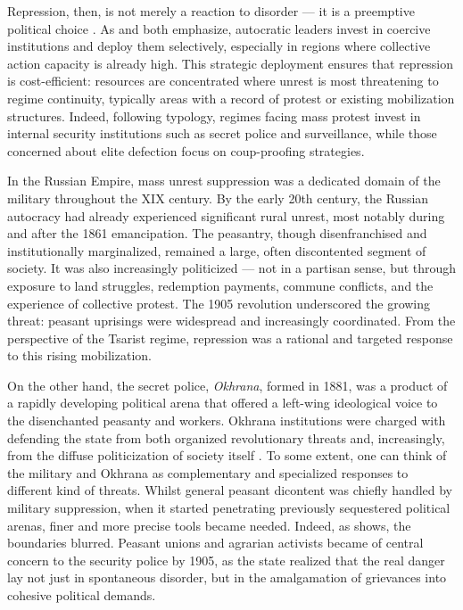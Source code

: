 \documentclass[11pt]{scrarticle}
\begin{document}
Repression, then, is not merely a reaction to disorder — it is a preemptive political choice \parencite{dimitrov_why_2013}. As \cite{greitens_dictators_2016} and \cite{slater_ordering_2010} both emphasize, autocratic leaders invest in coercive institutions and deploy them selectively, especially in regions where collective action capacity is already high. This strategic deployment ensures that repression is cost-efficient: resources are concentrated where unrest is most threatening to regime continuity, typically areas with a record of protest or existing mobilization structures. Indeed, following \cite{greitens_dictators_2016} typology, regimes facing mass protest invest in internal security institutions such as secret police and surveillance, while those concerned about elite defection focus on coup-proofing strategies. 

In the Russian Empire, mass unrest suppression was a dedicated domain of the military throughout the XIX century. By the early 20th century, the Russian autocracy had already experienced significant rural unrest, most notably during and after the 1861 emancipation. The peasantry, though disenfranchised and institutionally marginalized, remained a large, often discontented segment of society. It was also increasingly politicized — not in a partisan sense, but through exposure to land struggles, redemption payments, commune conflicts, and the experience of collective protest. The 1905 revolution underscored the growing threat: peasant uprisings were widespread and increasingly coordinated. From the perspective of the Tsarist regime, repression was a rational and targeted response to this rising mobilization.

On the other hand, the secret police, \textit{Okhrana}, formed in 1881, was a product of a rapidly developing political arena that offered a left-wing ideological voice to the disenchanted peasanty and workers. Okhrana institutions were charged with defending the state from both organized revolutionary threats and, increasingly, from the diffuse politicization of society itself \parencite{daly_autocracy_1998}. To some extent, one can think of the military and Okhrana as complementary and specialized responses to different kind of threats. Whilst general peasant dicontent was chiefly handled by military suppression, when it started penetrating previously sequestered political arenas, finer and more precise tools became needed. Indeed, as \cite{daly_autocracy_1998} shows, the boundaries blurred. Peasant unions and agrarian activists became of central concern to the security police by 1905, as the state realized that the real danger lay not just in spontaneous disorder, but in the amalgamation of grievances into cohesive political demands.
\end{document}
